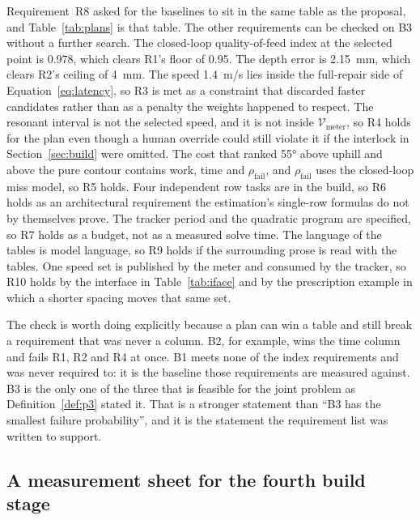 Requirement~R8 asked for the baselines to sit in the same table as the proposal, and Table~\ref{tab:plans} is that table. The other requirements can be checked on B3 without a further search. The closed-loop quality-of-feed index at the selected point is \num{0.978}, which clears R1's floor of \num{0.95}. The depth error is \SI{2.15}{mm}, which clears R2's ceiling of \SI{4}{mm}. The speed \SI{1.4}{m/s} lies inside the full-repair side of Equation~\eqref{eq:latency}, so R3 is met as a constraint that discarded faster candidates rather than as a penalty the weights happened to respect. The resonant interval is not the selected speed, and it is not inside \(\mathcal{V}_{\mathrm{meter}}\), so R4 holds for the plan even though a human override could still violate it if the interlock in Section~\ref{sec:build} were omitted. The cost that ranked \ang{55} above uphill and above the pure contour contains work, time and \(\rho_{\mathrm{fail}}\), and \(\rho_{\mathrm{fail}}\) uses the closed-loop miss model, so R5 holds. Four independent row tasks are in the build, so R6 holds as an architectural requirement the estimation's single-row formulas do not by themselves prove. The tracker period and the quadratic program are specified, so R7 holds as a budget, not as a measured solve time. The language of the tables is model language, so R9 holds if the surrounding prose is read with the tables. One speed set is published by the meter and consumed by the tracker, so R10 holds by the interface in Table~\ref{tab:iface} and by the prescription example in which a shorter spacing moves that same set.

The check is worth doing explicitly because a plan can win a table and still break a requirement that was never a column. B2, for example, wins the time column and fails R1, R2 and R4 at once. B1 meets none of the index requirements and was never required to: it is the baseline those requirements are measured against. B3 is the only one of the three that is feasible for the joint problem as Definition~\ref{def:p3} stated it. That is a stronger statement than ``B3 has the smallest failure probability'', and it is the statement the requirement list was written to support.

\subsection{A measurement sheet for the fourth build stage}

